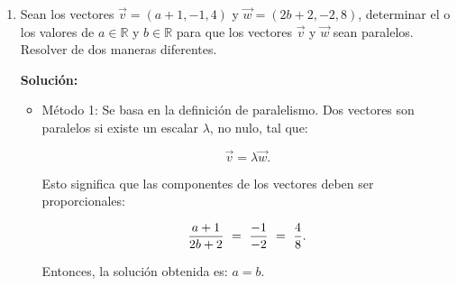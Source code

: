 \documentclass[11pt,a4paper]{article}
\newcommand{\indicador}[4]{
{\tikz[remember picture,overlay]\coordinate (#1) at #2;}{\tikz[remember picture,overlay]\coordinate (#3) at #4;} 
}
\begin{document}
\begin{enumerate}[\hspace{-5mm} 1) ]
\begin{enumerate}[a)]
\end{enumerate} 





 









\item Sean los vectores $\vec{v} = (a+1, -1, 4)$ y $\vec{w} = (2b+2, -2, 8)$, determinar el o los valores de $a \in \mathbb{R}$ y $b \in \mathbb{R}$ para que los vectores $\vec{v}$ y $\vec{w}$ sean paralelos. Resolver de dos maneras diferentes.


\textbf{Solución:}

\begin{itemize}
    \item Método 1: Se basa en la definición de paralelismo. Dos vectores son paralelos si existe un escalar $\lambda$, no nulo, tal que:

\[
\vec{v} = \lambda \vec{w}.
\]

Esto significa que las componentes de los vectores deben ser proporcionales:

\[
\frac{a+1}{2b+2} \ =\indicador{A}{(-.3,-.1)}{B}{(-.7,-.9)} \  \frac{-1}{-2} \  =\indicador{X}{(-.2,-.1)}{Y}{(.6,-.9)} \  \frac{4}{8}.
\]







\vspace{36mm} 

\hfill Entonces, la solución obtenida es: $a = b.$



\end{itemize}
\end{enumerate}
\end{document}
